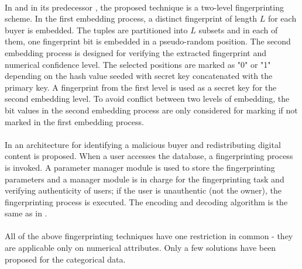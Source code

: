 \paragraph{}
In \cite{guo2006fingerprinting} and in its predecessor \cite{guo2005improved}, the proposed technique is a two-level fingerprinting scheme. 
In the first embedding process, a distinct fingerprint of length $L$ for each buyer is embedded. The tuples are partitioned into $L$ subsets and in each of them, one fingerprint bit is embedded in a pseudo-random position. 
The second embedding process is designed for verifying the extracted fingerprint and numerical confidence level. 
The selected positions are marked as "0" or "1" depending on the hash value seeded with secret key concatenated with the primary key.
A fingerprint from the first level is used as a secret key for the second embedding level.
To avoid conflict between two levels of embedding, the bit values in the second embedding process are only considered for marking if not marked in the first embedding process.
\paragraph{}
In \cite{zhou2007novel} an architecture for identifying a malicious buyer and redistributing digital content is proposed. 
When a user accesses the database, a fingerprinting process is invoked. 
A parameter manager module is used to store the fingerprinting parameters and a manager module is in charge for the fingerprinting task and verifying authenticity of users; if the user is unauthentic (not the owner), the fingerprinting process is executed. 
The encoding and decoding algorithm is the same as in \cite{guo2005improved}.
\paragraph{}
All of the above fingerprinting techniques have one restriction in common - they are applicable only on numerical attributes. Only a few solutions have been proposed for the categorical data.

